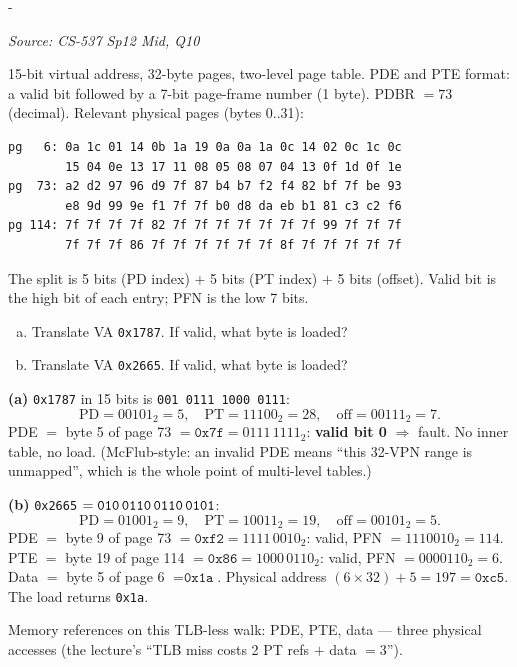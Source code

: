 \documentclass[11pt,a4paper]{article}
\makeatletter
\newcommand{\keepspace}[1]{\par\penalty-100\begingroup
  \setlength{\dimen@}{#1}\dimen@ii\pagegoal\advance\dimen@ii-\pagetotal
  \ifdim\dimen@>\dimen@ii\ifdim\dimen@ii>\z@\vfil\fi\break\fi\endgroup}
\newcounter{qn}[section]
\newenvironment{Qn}[4]{%
  \refstepcounter{qn}\keepspace{7\baselineskip}%
  \begin{tcolorbox}[qboxstyle, title={Q\thesection.\theqn\ \ [#1 \textbar\ #2]\ \ #4}]%
  {\footnotesize\color{g3}\textit{Source: #3}}\par\smallskip%
}{%
  \end{tcolorbox}%
}
\newenvironment{Sol}{%
  \begin{tcolorbox}[sboxstyle, title={Solution}]%
}{%
  \end{tcolorbox}\vspace{0.35em}%
}
\makeatother
\begin{document}
\begin{Qn}{Hard}{Lect 14}{CS-537 Sp12 Mid, Q10}{Two-level walk on a 15-bit address space}
15-bit virtual address, 32-byte pages, two-level page table. PDE and PTE
format: a valid bit followed by a 7-bit page-frame number (1 byte).
PDBR $= 73$ (decimal). Relevant physical pages (bytes 0..31):
\begin{lstlisting}[numbers=none]
pg   6: 0a 1c 01 14 0b 1a 19 0a 0a 1a 0c 14 02 0c 1c 0c
        15 04 0e 13 17 11 08 05 08 07 04 13 0f 1d 0f 1e
pg  73: a2 d2 97 96 d9 7f 87 b4 b7 f2 f4 82 bf 7f be 93
        e8 9d 99 9e f1 7f 7f b0 d8 da eb b1 81 c3 c2 f6
pg 114: 7f 7f 7f 7f 82 7f 7f 7f 7f 7f 7f 7f 99 7f 7f 7f
        7f 7f 7f 86 7f 7f 7f 7f 7f 7f 8f 7f 7f 7f 7f 7f
\end{lstlisting}
The split is 5 bits (PD index) $+$ 5 bits (PT index) $+$ 5 bits (offset).
Valid bit is the high bit of each entry; PFN is the low 7 bits.
\begin{enumerate}[(a)]
\item Translate VA \texttt{0x1787}. If valid, what byte is loaded?
\item Translate VA \texttt{0x2665}. If valid, what byte is loaded?
\end{enumerate}
\end{Qn}
\begin{Sol}
\textbf{(a)} \texttt{0x1787} in 15 bits is \texttt{001\,0111\,1000\,0111}:
\[
\mathrm{PD}=00101_2=5,\quad
\mathrm{PT}=11100_2=28,\quad
\mathrm{off}=00111_2=7.
\]
PDE $=$ byte 5 of page 73 $= \texttt{0x7f} = 0111\,1111_2$:
\textbf{valid bit 0} $\Rightarrow$ fault. No inner table, no load.
(McFlub-style: an invalid PDE means ``this 32-VPN range is unmapped'',
which is the whole point of multi-level tables.)

\textbf{(b)} \texttt{0x2665} $= \texttt{010\,0110\,0110\,0101}$:
\[
\mathrm{PD}=01001_2=9,\quad
\mathrm{PT}=10011_2=19,\quad
\mathrm{off}=00101_2=5.
\]
PDE $=$ byte 9 of page 73 $= \texttt{0xf2} = 1111\,0010_2$: valid, PFN
$= 1110010_2 = 114$. PTE $=$ byte 19 of page 114 $= \texttt{0x86}
= 1000\,0110_2$: valid, PFN $= 0000110_2 = 6$. Data $=$ byte 5 of
page 6 $= \texttt{0x1a}$. Physical address
$(6\times 32)+5 = 197 = \texttt{0xc5}$. The load returns \texttt{0x1a}.

Memory references on this TLB-less walk: PDE, PTE, data --- three
physical accesses (the lecture's ``TLB miss costs 2 PT refs $+$ data
$= 3$'').
\end{Sol}
\end{document}
